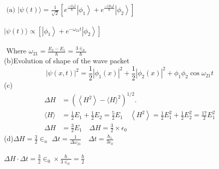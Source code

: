 \begin{enumerate}
\begin{answer}
	$\text { (a) }|\psi(t)\rangle=\frac{1}{\sqrt{2}}\left[e^{\frac{-i \epsilon_{0} t}{\hbar}}\left|\phi_{1}\right\rangle+e^{\frac{-i 4 \epsilon_{0} t}{\hbar}}\left|\phi_{2}\right\rangle\right]$\\\\
	$|\psi(t)\rangle \propto\left[\left|\phi_{1}\right\rangle+e^{-\omega_{21} t}\left|\phi_{2}\right\rangle\right]$\\\\
	$\text { Where } \omega_{21}=\frac{E_{2}-E_{1}}{\hbar}=\frac{3 \in_{0}}{\hbar}$\\
	(b)Evolution of shape of the wave packet
	$$
	|\psi(x, t)|^{2}=\frac{1}{2}\left|\phi_{1}(x)\right|^{2}+\frac{1}{2}\left|\phi_{2}(x)\right|^{2}+\phi_{1} \phi_{2} \cos \omega_{21} t
	$$
	(c)\begin{align*}
		\Delta H &=\left(\left\langle H^{2}\right\rangle-\langle H\rangle^{2}\right)^{1 / 2} . \\
		\langle H\rangle &=\frac{1}{2} E_{1}+\frac{1}{2} E_{2}=\frac{5}{2} E_{1} \quad\left\langle H^{2}\right\rangle=\frac{1}{2} E_{1}^{2}+\frac{1}{2} E_{2}^{2}=\frac{17}{2} E_{1}^{2} \\
		\Delta H &=\frac{3}{2} E_{1} \quad \Delta H=\frac{3}{2} \times \epsilon_{0}
	\end{align*}
	(d)$\Delta H=\frac{3}{2} \in_{n}$
	$\Delta t=\frac{1}{\Delta \omega_{21}} \quad \Delta t=\frac{\hbar_{1}}{3 \epsilon_{0}}$\\\\
	$
	\Delta H \cdot \Delta t=\frac{3}{2} \in_{0} \times \frac{\hbar}{3 \in_{0}}=\frac{\hbar}{2}
	$
\end{answer}
\end{enumerate}